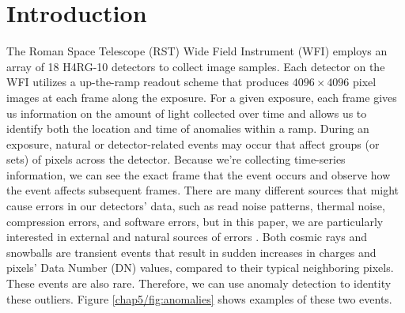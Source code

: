 \section{Introduction}
The Roman Space Telescope (RST) Wide Field Instrument (WFI) employs an array of 18 H4RG-10 detectors to collect image samples.
Each detector on the WFI utilizes a up-the-ramp readout scheme that produces $4096 \times 4096$ pixel images at each frame along the exposure. 
For a given exposure, each frame gives us information on the amount of light collected over time and allows us to identify both the location and time of anomalies within a ramp.
During an exposure, natural or detector-related events may occur that affect groups (or sets) of pixels across the detector. 
Because we're collecting time-series information, we can see the exact frame that the event occurs and observe how the event affects subsequent frames. 
There are many different sources that might cause errors in our detectors' data, such as read noise patterns, thermal noise, compression errors, and software errors, but in this paper, we are particularly interested in external and natural sources of errors \cite{cillis2018snowballs}. 
Both cosmic rays and snowballs are transient events that result in sudden increases in charges and pixels’ Data Number (DN) values, compared to their typical neighboring pixels.
These events are also rare.
Therefore, we can use anomaly detection to identity these outliers.
Figure \ref{chap5/fig:anomalies} shows examples of these two events.

